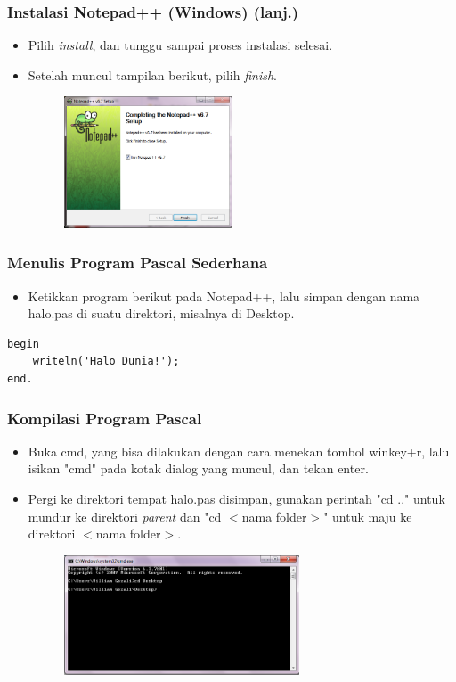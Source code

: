 \documentclass{beamer}
\begin{document}
\begin{frame}
\frametitle{Instalasi Notepad++ (Windows) (lanj.)}
\begin{itemize}
	\item Pilih \textit{install}, dan tunggu sampai proses instalasi selesai.
	\item Setelah muncul tampilan berikut, pilih \textit{finish}.
	\begin{figure}
		\includegraphics[width=5cm]{asset/npp_9.PNG}
	\end{figure}
\end{itemize}
\end{frame}

\begin{frame}[fragile]
\frametitle{Menulis Program Pascal Sederhana}
\begin{itemize}
	\item Ketikkan program berikut pada Notepad++, lalu simpan dengan nama halo.pas di suatu direktori, misalnya di Desktop.
\end{itemize}
\begin{lstlisting}
begin
    writeln('Halo Dunia!');
end.
\end{lstlisting}
\end{frame}

\begin{frame}
\frametitle{Kompilasi Program Pascal}
\begin{itemize}
	\item Buka cmd, yang bisa dilakukan dengan cara menekan tombol winkey+r, lalu isikan "cmd" pada kotak dialog yang muncul, dan tekan enter.
	\item Pergi ke direktori tempat halo.pas disimpan, gunakan perintah "cd .." untuk mundur ke direktori \textit{parent} dan "cd $<$nama folder$>$" untuk maju ke direktori $<$nama folder$>$.
	\begin{figure}
		\includegraphics[width=7cm]{asset/hello_2.PNG}
	\end{figure}
\end{itemize}
\end{frame}
\end{document}
